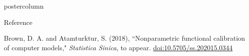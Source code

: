 \documentclass[final,10pt]{beamer}  %
\begin{document}
\begin{frame}{}
\begin{columns}[t]
\begin{column}{.33\textwidth}
\begin{beamercolorbox}[center,wd=1.625\textwidth]{postercolumn}
\begin{minipage}[T]{\textwidth}
{\begin{block}{Reference}
{            Brown, D. A. and Atamturktur, S. (2018), ``Nonparametric functional calibration of computer models," {\em Statistica Sinica}, to appear. \url{doi:10.5705/ss.202015.0344}

            }
        \end{block}


        }%
        \end{minipage}
        \end{beamercolorbox}
    \end{column}
%
%
%
    \end{columns}
\end{frame}
\end{document}
